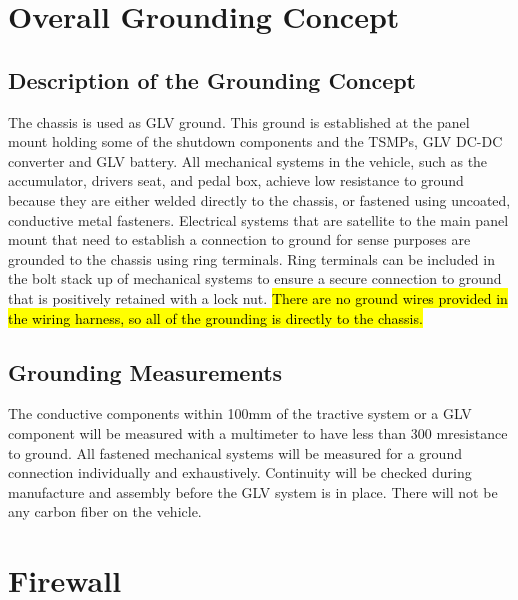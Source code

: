 \documentclass{article}
\DeclareRobustCommand{\hlr}[1]{{\sethlcolor{red}\hl{#1}}}
\begin{document}
\newpage

\section{Overall Grounding Concept}

    \subsection{Description of the Grounding Concept}


        The chassis is used as GLV ground. This ground is established at the panel mount holding some of the shutdown components and the TSMPs, GLV DC-DC converter and GLV battery. All mechanical systems in the vehicle, such as the accumulator, drivers seat, and pedal box, achieve low resistance to ground because they are either welded directly to the chassis, or fastened using uncoated, conductive metal fasteners. Electrical systems that are satellite to the main panel mount that need to establish a connection to ground for sense purposes are grounded to the chassis using ring terminals. Ring terminals can be included in the bolt stack up of mechanical systems to ensure a secure connection to ground that is positively retained with a lock nut. \hlr{There are no ground wires provided in the wiring harness, so all of the grounding is directly to the chassis.}


    \subsection{Grounding Measurements}

        The conductive components within 100mm of the tractive system or a GLV component will be measured with a multimeter to have less than 300 m\ohm resistance to ground. All fastened mechanical systems will be measured for a ground connection individually and exhaustively. Continuity will be checked during manufacture and assembly before the GLV system is in place. There will not be any carbon fiber on the vehicle.

\newpage

\section{Firewall}
\end{document}
